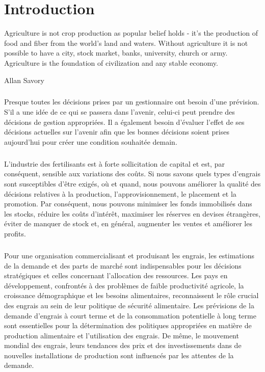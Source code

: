 \chapter*{Introduction}
\epigraph{Agriculture is not crop production as popular belief holds - it's the production of food and fiber from the world's land and waters. Without agriculture it is not possible to have a city, stock market, banks, university, church or army. Agriculture is the foundation of civilization and any stable economy.}{Allan Savory}

\paragraph{}
Presque toutes les décisions prises par un gestionnaire ont besoin d'une prévision. S'il a une idée de ce qui se passera dans l'avenir, celui-ci peut prendre des décisions de gestion appropriées. Il a également besoin d'évaluer l'effet de ses décisions actuelles sur l'avenir afin que les bonnes décisions soient prises aujourd'hui pour créer une condition souhaitée demain.
\paragraph{}
L’industrie des fertilisants est à forte sollicitation de capital et est, par conséquent, sensible aux variations des coûts. Si nous savons quels types d'engrais sont susceptibles d'être exigés, où et quand, nous pouvons améliorer la qualité des décisions relatives à la production, l'approvisionnement, le placement et la promotion. Par conséquent, nous pouvons minimiser les fonds immobilisés dans les stocks, réduire les coûts d'intérêt, maximiser les réserves en devises étrangères, éviter de manquer de stock et, en général, augmenter les ventes et améliorer les profits.
\paragraph{}
Pour une organisation commercialisant et produisant les engrais, les estimations de la demande et des parts de marché sont indispensables pour les décisions stratégiques et celles concernant l'allocation des ressources. Les pays en développement, confrontés à des problèmes de faible productivité agricole, la croissance démographique et les besoins alimentaires, reconnaissent le rôle crucial des engrais au sein de leur politique de sécurité alimentaire. Les prévisions de la demande d'engrais à court terme et de la consommation potentielle à long terme sont essentielles pour la détermination des politiques appropriées en matière de production alimentaire et l'utilisation des engrais. De même, le mouvement mondial des engrais, leurs tendances des prix et des investissements dans de nouvelles installations de production sont influencés par les attentes de la demande.
